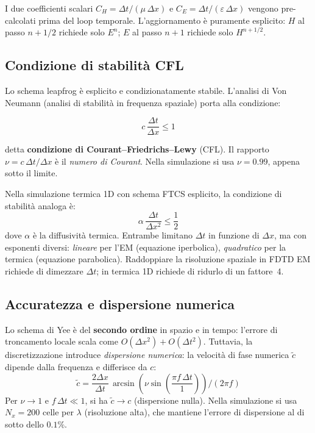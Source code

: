 \documentclass[a4paper, 11pt]{article}
\newcommand{\eps}{\varepsilon}
\newcommand{\muu}{\mu}
\newcommand{\dx}{\Delta x}
\newcommand{\dt}{\Delta t}
\begin{document}
I due coefficienti scalari $C_H = \dt/(\muu\,\dx)$ e $C_E = \dt/(\eps\,\dx)$
vengono pre-calcolati prima del loop temporale. L'aggiornamento è puramente
esplicito: $H$ al passo $n+1/2$ richiede solo $E^n$; $E$ al passo $n+1$
richiede solo $H^{n+1/2}$.

\subsection{Condizione di stabilità CFL}

Lo schema leapfrog è esplicito e condizionatamente stabile. L'analisi di
Von Neumann (analisi di stabilità in frequenza spaziale) porta alla condizione:

\begin{equation}
    \boxed{c\,\frac{\dt}{\dx} \le 1}
    \label{eq:CFL}
\end{equation}

detta \textbf{condizione di Courant--Friedrichs--Lewy} (CFL). Il rapporto
$\nu = c\,\dt/\dx$ è il \emph{numero di Courant}. Nella simulazione si usa
$\nu = 0.99$, appena sotto il limite.

\begin{analogia}
Nella simulazione termica 1D con schema FTCS esplicito, la condizione di
stabilità analoga è:
\[
    \alpha\,\frac{\dt}{\dx^2} \le \frac{1}{2}
\]
dove $\alpha$ è la diffusività termica. Entrambe limitano $\dt$ in funzione di
$\dx$, ma con esponenti diversi: \emph{lineare} per l'EM (equazione iperbolica),
\emph{quadratico} per la termica (equazione parabolica). Raddoppiare la
risoluzione spaziale in FDTD EM richiede di dimezzare $\dt$; in termica 1D
richiede di ridurlo di un fattore~4.
\end{analogia}

\subsection{Accuratezza e dispersione numerica}

Lo schema di Yee è del \textbf{secondo ordine} in spazio e in tempo:
l'errore di troncamento locale scala come $O(\dx^2) + O(\dt^2)$.
Tuttavia, la discretizzazione introduce \emph{dispersione numerica}: la velocità
di fase numerica $\tilde{c}$ dipende dalla frequenza e differisce da $c$:
\begin{equation}
    \tilde{c} = \frac{2\dx}{\dt}\,
    \arcsin\!\left(\nu\sin\!\left(\frac{\pi f\,\dt}{1}\right)\right)
    \bigg/ (2\pi f)
    \label{eq:dispersion}
\end{equation}
Per $\nu\to 1$ e $f\,\dt \ll 1$, si ha $\tilde{c}\to c$ (dispersione nulla).
Nella simulazione si usa $N_x = 200$ celle per $\lambda$ (risoluzione alta),
che mantiene l'errore di dispersione al di sotto dello $0.1\%$.
\end{document}
